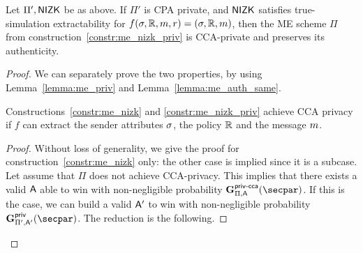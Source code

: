 \begin{theorem}\label{theo:me_nizk_priv}
    Let $\Pi', \mathsf{NIZK}$ be as above.
    If $\Pi'$ is CPA private, and $\mathsf{NIZK}$ satisfies true-simulation extractability for $f(\sigma, \mathbb{R}, m, r) = (\sigma, \mathbb{R}, m)$, then the ME scheme $\Pi$ from construction~\ref{constr:me_nizk_priv} is CCA-private and preserves its authenticity.
\end{theorem}

\begin{proof}
    We can separately prove the two properties, by using Lemma~\ref{lemma:me_priv} and Lemma~\ref{lemma:me_auth_same}.

    \begin{lemma}\label{lemma:me_priv}
        Constructions~\ref{constr:me_nizk} and \ref{constr:me_nizk_priv}  achieve CCA privacy if $f$ can extract the sender attributes $\sigma$, the policy $\mathbb{R}$ and the message $m$.
        \begin{proof}
            Without loss of generality, we give the proof for construction~\ref{constr:me_nizk} only: the other case is implied since it is a subcase.
            Let assume that $\Pi$ does not achieve CCA-privacy.
            This implies that there exists a valid $\mathsf{A}$ able to win with non-negligible probability $\NISHmatchgamecca{}_{\Pi, \adversary}(\secpar)$.
            If this is the case, we can build a valid $\mathsf{A}'$ to win with non-negligible probability $\NISHmatchgame{}_{\Pi', \adversary'}(\secpar)$.
            The reduction is the following.


\end{proof}
\end{lemma}
\end{proof}
